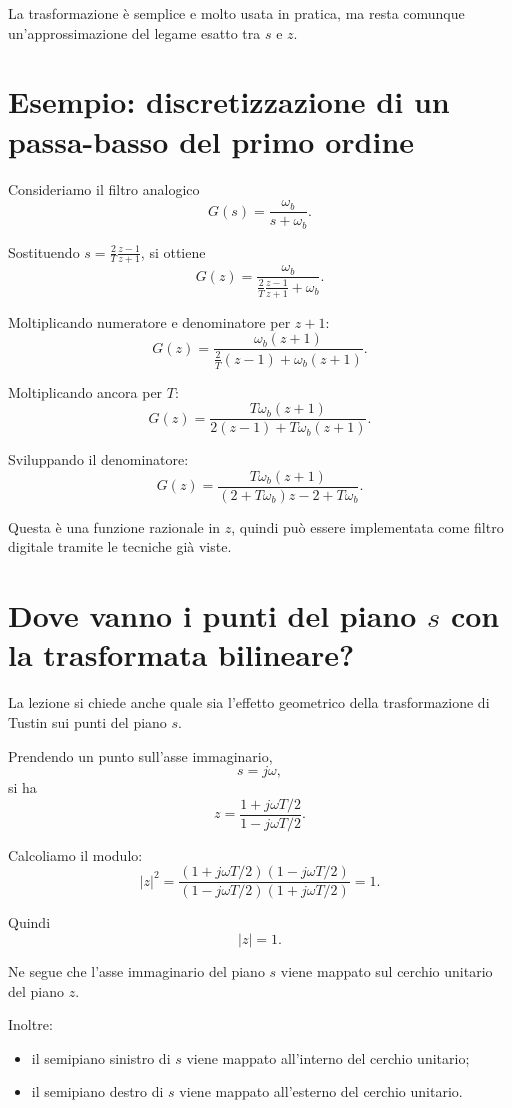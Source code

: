 La trasformazione \`e semplice e molto usata in pratica,
ma resta comunque un'approssimazione del legame esatto tra \(s\) e \(z\).

\section{Esempio: discretizzazione di un passa-basso del primo ordine}

Consideriamo il filtro analogico
\[
G(s)=\frac{\omega_b}{s+\omega_b}.
\]

Sostituendo \(s=\frac{2}{T}\frac{z-1}{z+1}\), si ottiene
\[
G(z)=\frac{\omega_b}{\frac{2}{T}\frac{z-1}{z+1}+\omega_b}.
\]

Moltiplicando numeratore e denominatore per \(z+1\):
\[
G(z)=
\frac{\omega_b(z+1)}
{\frac{2}{T}(z-1)+\omega_b(z+1)}.
\]

Moltiplicando ancora per \(T\):
\[
G(z)=
\frac{T\omega_b(z+1)}
{2(z-1)+T\omega_b(z+1)}.
\]

Sviluppando il denominatore:
\[
G(z)=
\frac{T\omega_b(z+1)}
{(2+T\omega_b)z-2+T\omega_b}.
\]

Questa \`e una funzione razionale in \(z\), quindi pu\`o essere implementata
come filtro digitale tramite le tecniche gi\`a viste.

\section{Dove vanno i punti del piano \(s\) con la trasformata bilineare?}

La lezione si chiede anche quale sia l'effetto geometrico della trasformazione di Tustin
sui punti del piano \(s\).

Prendendo un punto sull'asse immaginario,
\[
s=j\omega,
\]
si ha
\[
z=\frac{1+j\omega T/2}{1-j\omega T/2}.
\]

Calcoliamo il modulo:
\[
|z|^2
=
\frac{\left(1+j\omega T/2\right)\left(1-j\omega T/2\right)}
{\left(1-j\omega T/2\right)\left(1+j\omega T/2\right)}
=1.
\]

Quindi
\[
|z|=1.
\]

Ne segue che l'asse immaginario del piano \(s\) viene mappato sul cerchio unitario del piano \(z\).

Inoltre:
\begin{itemize}
    \item il semipiano sinistro di \(s\) viene mappato all'interno del cerchio unitario;
    \item il semipiano destro di \(s\) viene mappato all'esterno del cerchio unitario.
\end{itemize}

